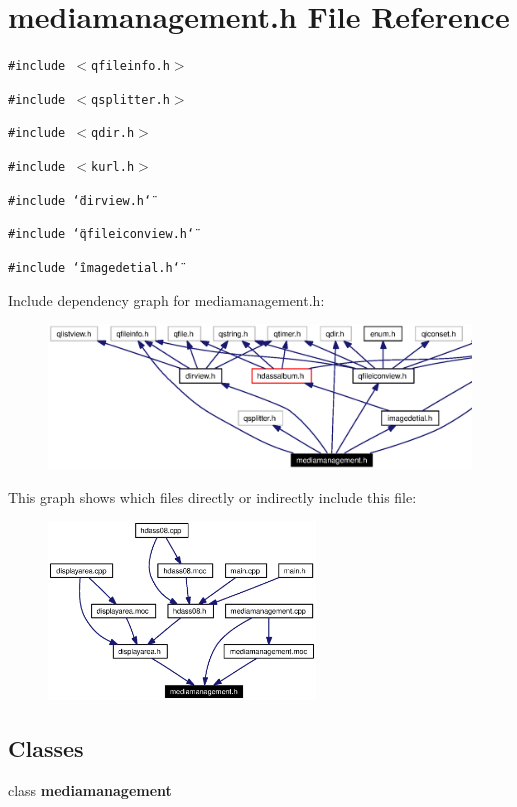 \section{mediamanagement.h File Reference}
\label{mediamanagement_8h}


{\tt \#include $<$qfileinfo.h$>$}\par
{\tt \#include $<$qsplitter.h$>$}\par
{\tt \#include $<$qdir.h$>$}\par
{\tt \#include $<$kurl.h$>$}\par
{\tt \#include \char`\"{}dirview.h\char`\"{}}\par
{\tt \#include \char`\"{}qfileiconview.h\char`\"{}}\par
{\tt \#include \char`\"{}imagedetial.h\char`\"{}}\par


Include dependency graph for mediamanagement.h:\begin{figure}[H]
\begin{center}
\leavevmode
\includegraphics[width=363pt]{mediamanagement_8h__incl}
\end{center}
\end{figure}


This graph shows which files directly or indirectly include this file:\begin{figure}[H]
\begin{center}
\leavevmode
\includegraphics[width=201pt]{mediamanagement_8h__dep__incl}
\end{center}
\end{figure}
\subsection*{Classes}
\begin{CompactItemize}
\item 
class {\bf mediamanagement}
\end{CompactItemize}
